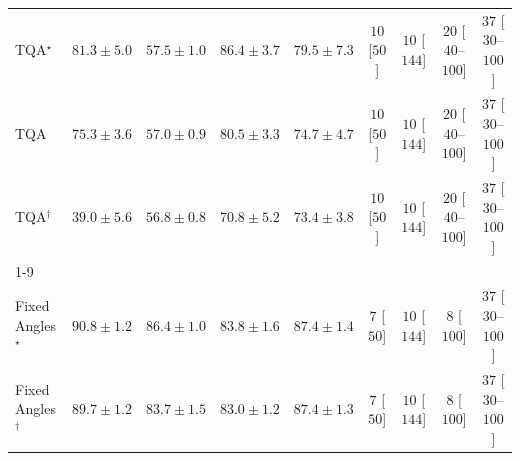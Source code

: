 \begin{tabular}{l|cccc|cccc|}
TQA$^\star$ & {\cellcolor[HTML]{B64203}} \color[HTML]{F1F1F1} $81.3\pm 5.0$ & {\cellcolor[HTML]{FEC95B}} \color[HTML]{000000} $57.5\pm 1.0$ & {\cellcolor[HTML]{8E3104}} \color[HTML]{F1F1F1} $86.4\pm 3.7$ & {\cellcolor[HTML]{C34802}} \color[HTML]{F1F1F1} $79.5\pm 7.3$ & {\cellcolor[HTML]{FFF7F3}} \color[HTML]{000000} $10$ [$50$] & {\cellcolor[HTML]{FFF7F3}} \color[HTML]{000000} $10$ [$144$] & {\cellcolor[HTML]{FFF4F0}} \color[HTML]{000000} $20$ [$40$--$100$] & {\cellcolor[HTML]{FEF1ED}} \color[HTML]{000000} $37$ [$30$--$100$] \\
TQA & {\cellcolor[HTML]{DB5D0B}} \color[HTML]{F1F1F1} $75.3\pm 3.6$ & {\cellcolor[HTML]{FECC61}} \color[HTML]{000000} $57.0\pm 0.9$ & {\cellcolor[HTML]{BC4503}} \color[HTML]{F1F1F1} $80.5\pm 3.3$ & {\cellcolor[HTML]{DE610C}} \color[HTML]{F1F1F1} $74.7\pm 4.7$ & {\cellcolor[HTML]{FFF7F3}} \color[HTML]{000000} $10$ [$50$] & {\cellcolor[HTML]{FFF7F3}} \color[HTML]{000000} $10$ [$144$] & {\cellcolor[HTML]{FFF4F0}} \color[HTML]{000000} $20$ [$40$--$100$] & {\cellcolor[HTML]{FEF1ED}} \color[HTML]{000000} $37$ [$30$--$100$] \\
TQA$^\dagger$ & {\cellcolor[HTML]{FFFFE5}} \color[HTML]{000000} $39.0\pm 5.6$ & {\cellcolor[HTML]{FECD63}} \color[HTML]{000000} $56.8\pm 0.8$ & {\cellcolor[HTML]{EF7718}} \color[HTML]{F1F1F1} $70.8\pm 5.2$ & {\cellcolor[HTML]{E46710}} \color[HTML]{F1F1F1} $73.4\pm 3.8$ & {\cellcolor[HTML]{FFF7F3}} \color[HTML]{000000} $10$ [$50$] & {\cellcolor[HTML]{FFF7F3}} \color[HTML]{000000} $10$ [$144$] & {\cellcolor[HTML]{FFF4F0}} \color[HTML]{000000} $20$ [$40$--$100$] & {\cellcolor[HTML]{FEF1ED}} \color[HTML]{000000} $37$ [$30$--$100$] \\
\cline{1-9}
\multicolumn{9}{c}{\rule{0pt}{8pt}PP} \\
\midrule
Fixed Angles$^\star$ & {\cellcolor[HTML]{00482A}} \color[HTML]{F1F1F1} $90.8\pm 1.2$ & {\cellcolor[HTML]{006034}} \color[HTML]{F1F1F1} $86.4\pm 1.0$ & {\cellcolor[HTML]{066D39}} \color[HTML]{F1F1F1} $83.8\pm 1.6$ & {\cellcolor[HTML]{005B32}} \color[HTML]{F1F1F1} $87.4\pm 1.4$ & {\cellcolor[HTML]{FFF7F3}} \color[HTML]{000000} $7$ [$50$] & {\cellcolor[HTML]{FFF7F3}} \color[HTML]{000000} $10$ [$144$] & {\cellcolor[HTML]{FFF7F3}} \color[HTML]{000000} $8$ [$100$] & {\cellcolor[HTML]{FEF1ED}} \color[HTML]{000000} $37$ [$30$--$100$] \\
Fixed Angles$^\dagger$ & {\cellcolor[HTML]{004F2D}} \color[HTML]{F1F1F1} $89.7\pm 1.2$ & {\cellcolor[HTML]{076D39}} \color[HTML]{F1F1F1} $83.7\pm 1.5$ & {\cellcolor[HTML]{0A703A}} \color[HTML]{F1F1F1} $83.0\pm 1.2$ & {\cellcolor[HTML]{005B32}} \color[HTML]{F1F1F1} $87.4\pm 1.3$ & {\cellcolor[HTML]{FFF7F3}} \color[HTML]{000000} $7$ [$50$] & {\cellcolor[HTML]{FFF7F3}} \color[HTML]{000000} $10$ [$144$] & {\cellcolor[HTML]{FFF7F3}} \color[HTML]{000000} $8$ [$100$] & {\cellcolor[HTML]{FEF1ED}} \color[HTML]{000000} $37$ [$30$--$100$] \\

\end{tabular}
